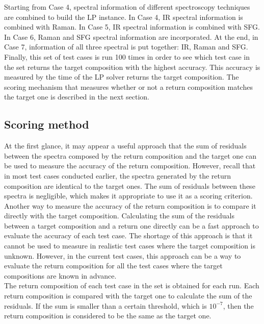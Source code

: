 Starting from Case 4, spectral information of different spectroscopy techniques are combined to build the LP instance. In Case 4, IR spectral information is combined with Raman. In Case 5, IR spectral information is combined with SFG. In Case 6, Raman and SFG spectral information are incorporated. At the end, in Case 7, information of all three spectral is put together: IR, Raman and SFG. \\

Finally, this set of test cases is run 100 times in order to see which test case in the set returns the target composition with the highest accuracy. This accuracy is measured by the time of the LP solver returns the target composition. The scoring mechanism that measures whether or not a return composition matches the target one is described in the next section. \\

\subsection{Scoring method}

At the first glance, it may appear a useful approach that the sum of residuals between the spectra composed by the return composition and the target one can be used to measure the accuracy of the return composition. However, recall that in most test cases conducted earlier, the spectra generated by the return composition are identical to the target ones. The sum of residuals between these spectra is negligible, which makes it appropriate to use it as a scoring criterion. \\

Another way to measure the accuracy of the return composition is to compare it directly with the target composition. Calculating the sum of the residuals between a target composition and a return one directly can be a fast approach to evaluate the accuracy of each test case. The shortage of this approach is that it cannot be used to measure in realistic test cases where the target composition is unknown. However, in the current test cases, this approach can be a way to evaluate the return composition for all the test cases where the target compositions are known in advance. \\

The return composition of each test case in the set is obtained for each run. Each return composition is compared with the target one to calculate the sum of the residuals. If the sum is smaller than a certain threshold, which is $10^{-7}$, then the return composition is considered to be the same as the target one. \\

